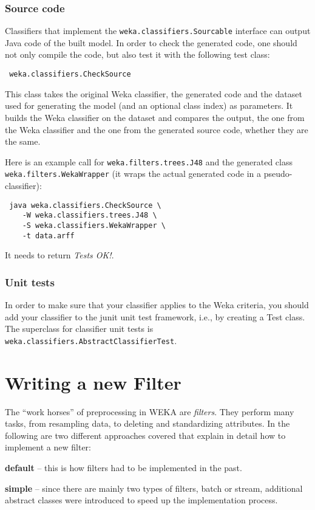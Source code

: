 \subsubsection*{Source code}
Classifiers that implement the \texttt{weka.classifiers.Sourcable} interface can
output Java code of the built model. In order to check the generated  code, one
should not only compile the code, but also test it with the following test
class:
\begin{verbatim}
 weka.classifiers.CheckSource
\end{verbatim}
This class takes the original Weka classifier, the generated code and the
dataset used for generating the model (and an optional class index) as
parameters. It builds the Weka classifier on the dataset and compares the
output, the one from the Weka classifier and the one from the generated source
code, whether they are the same.

Here is an example call for \texttt{weka.filters.trees.J48} and the
generated class \texttt{weka.filters.WekaWrapper} (it wraps the actual generated
code in a pseudo-classifier):
\begin{verbatim}
 java weka.classifiers.CheckSource \
    -W weka.classifiers.trees.J48 \
    -S weka.classifiers.WekaWrapper \
    -t data.arff
\end{verbatim}
It needs to return \textit{Tests OK!}.

\subsubsection*{Unit tests}
In order to make sure that your classifier applies to the Weka criteria, you
should add your classifier to the junit unit test framework, i.e., by creating a
Test class. The superclass for classifier unit tests is
\texttt{weka.classifiers.AbstractClassifierTest}.


\newpage
\section{Writing a new Filter}
The ``work horses'' of preprocessing in WEKA are \textit{filters}. They perform
many tasks, from resampling data, to deleting and standardizing attributes. In
the following are two different approaches covered that explain in detail how
to implement a new filter:
\begin{tight_itemize}
  \item \textbf{default} -- this is how filters had to be implemented in the
past.
  \item \textbf{simple }-- since there are mainly two types of filters, batch or
stream, additional abstract classes were introduced to speed up
the implementation process.
\end{tight_itemize}

